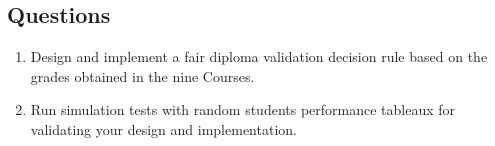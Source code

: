 \subsection{Questions}
\label{sec:15.5.2}

\begin{enumerate}
\item Design and implement a fair diploma validation decision rule based on the grades obtained in the nine Courses.
\item Run simulation tests with random students performance tableaux for validating your design and implementation.
\end{enumerate}

